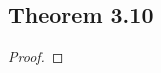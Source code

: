 \documentclass[../../main.tex]{subfiles}
\begin{document}
\subsection{Theorem 3.10}
\begin{wts}

\end{wts}
\begin{proof}

\end{proof}
\end{document}
